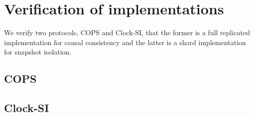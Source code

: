 \section{Verification of implementations}
\label{sec:implementation-verification}
\label{app:implementation-verification}
We verify two protocols, COPS and Clock-SI, that the former is a full replicated implementation for causal consistency and the latter is a shard implementation for snapshot isolation.
\subsection{COPS}
\label{sec:cops}


\subsection{Clock-SI}
\label{sec:clock-si}


